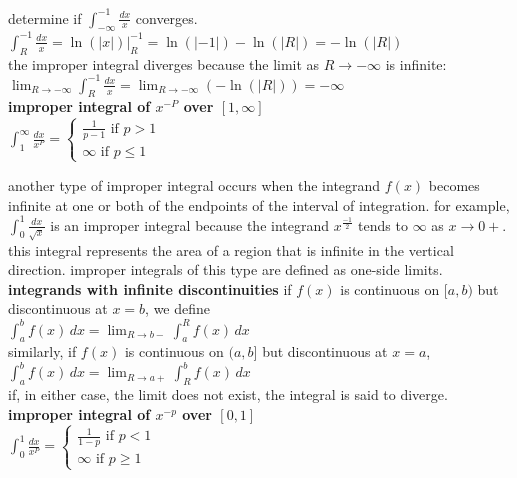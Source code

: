 \documentclass{article}
\begin{document}
determine if $\int_{-\infty}^{-1}\frac{dx}{x}$ converges.\\
$\int_{R}^{-1}\frac{dx}{x} = \ln(\lvert x\rvert)\Big|_{R}^{-1} = \ln(\lvert -1\rvert) - \ln(\lvert R\rvert) = -\ln(\lvert R\rvert)$\\ the improper integral diverges because the limit as $R \to -\infty$ is infinite:\\
$\lim_{R \to -\infty}\int_{R}^{-1}\frac{dx}{x} = \lim_{R \to -\infty}(-\ln(\lvert R\rvert)) = -\infty$\\

\textbf{improper integral of $x^{-P}$ over $[1, \infty]$}\\
$\int_{1}^{\infty}\frac{dx}{x^P} = 
\begin{cases}
	\frac{1}{p - 1} \text{ if } p>1\\
	\infty \text{ if } p\leq1
\end{cases}$

another type of improper integral occurs when the integrand $f(x)$ becomes infinite at one or both of the endpoints of the interval of integration. for example, $\int_{0}^{1}\frac{dx}{\sqrt{x}}$ is an improper integral because the integrand $x^{\frac{-1}{2}}$ tends to $\infty$ as $x \to 0+$. this integral represents the area of a region that is infinite in the vertical direction. improper integrals of this type are defined as one-side limits.\\

\textbf{integrands with infinite discontinuities} if $f(x)$ is continuous on $[a, b)$ but discontinuous at $x = b$, we define\\
$\int_{a}^{b}f(x)\,dx = \lim_{R \to b-}\int_{a}^{R}f(x)\,dx$\\
similarly, if $f(x)$ is continuous on $(a, b]$ but discontinuous at $x = a$,\\
$\int_{a}^{b}f(x)\,dx = \lim_{R \to a+}\int_{R}^{b}f(x)\,dx$\\
if, in either case, the limit does not exist, the integral is said to diverge.\\

\textbf{improper integral of $x^{-p}$ over $[0, 1]$}\\
$\int_{0}^{1}\frac{dx}{x^P} = 
\begin{cases}
	\frac{1}{1 - p} \text{ if } p<1\\
	\infty \text{ if } p\geq1
\end{cases}$
\end{document}
